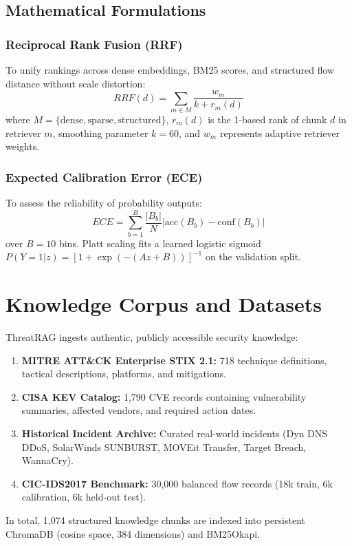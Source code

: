 \documentclass[conference]{IEEEtran}
\begin{document}
\subsection{Mathematical Formulations}
\subsubsection{Reciprocal Rank Fusion (RRF)}
To unify rankings across dense embeddings, BM25 scores, and structured flow distance without scale distortion:
\begin{equation}
RRF(d) = \sum_{m \in M} \frac{w_m}{k + r_m(d)}
\end{equation}
where $M = \{\text{dense}, \text{sparse}, \text{structured}\}$, $r_m(d)$ is the 1-based rank of chunk $d$ in retriever $m$, smoothing parameter $k = 60$, and $w_m$ represents adaptive retriever weights.

\subsubsection{Expected Calibration Error (ECE)}
To assess the reliability of probability outputs:
\begin{equation}
ECE = \sum_{b=1}^{B} \frac{|B_b|}{N} \left| \text{acc}(B_b) - \text{conf}(B_b) \right|
\end{equation}
over $B = 10$ bins. Platt scaling fits a learned logistic sigmoid $P(Y=1|z) = [1 + \exp(-(Az + B))]^{-1}$ on the validation split.

\section{Knowledge Corpus and Datasets}
ThreatRAG ingests authentic, publicly accessible security knowledge:
\begin{enumerate}
    \item \textbf{MITRE ATT\&CK Enterprise STIX 2.1:} 718 technique definitions, tactical descriptions, platforms, and mitigations.
    \item \textbf{CISA KEV Catalog:} 1,790 CVE records containing vulnerability summaries, affected vendors, and required action dates.
    \item \textbf{Historical Incident Archive:} Curated real-world incidents (Dyn DNS DDoS, SolarWinds SUNBURST, MOVEit Transfer, Target Breach, WannaCry).
    \item \textbf{CIC-IDS2017 Benchmark:} 30,000 balanced flow records (18k train, 6k calibration, 6k held-out test).
\end{enumerate}
In total, 1,074 structured knowledge chunks are indexed into persistent ChromaDB (cosine space, 384 dimensions) and BM25Okapi.
\end{document}
